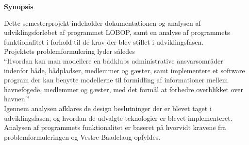 \begin{center}\textbf{Synopsis}\\ \end{center}

Dette semesterprojekt indeholder dokumentationen og analysen af udviklingsforløbet af programmet LOBOP, samt en analyse af programmets funktionalitet i forhold til de krav der blev stillet i udviklingsfasen.\\

Projektets problemformulering lyder således\\

\enquote{Hvordan kan man modellere en bådklubs administrative ansvarsområder indenfor både, bådpladser, medlemmer og gæster, samt implementere et software program der kan benytte modellerne til formidling af informationer mellem havnefogede, medlemmer og gæster, med det formål at forbedre overblikket over havnen.}\\

Igennem analysen afklares de design beslutninger der er blevet taget i udviklingsfasen, og hvordan de udvalgte teknologier er blevet implementeret. Analysen af programmets funktionalitet er baseret på hvorvidt kravene fra problemformuleringen og Vestre Baadelaug opfyldes.
	






